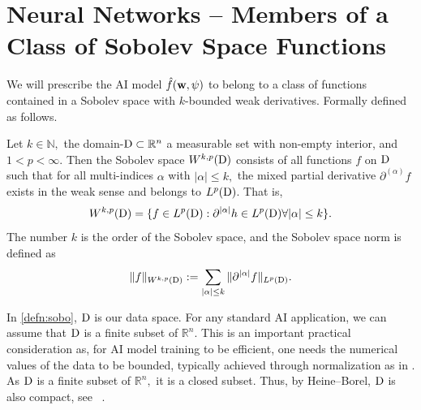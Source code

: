 \section{Neural Networks --  Members of a Class of Sobolev Space Functions}\label{sec:sobolev}
We will prescribe the AI model $\hat{f}(\boldsymbol{\mathrm{w}}, \psi)$ to belong to a class of functions contained in a Sobolev space with $k$-bounded weak derivatives. Formally defined as follows.
\begin{definition}\label{defn:sobo}
    Let $k \in \mathbb{N},$ the domain-$\mathrm{D} \subset \mathbb{R}^n$ a measurable set with non-empty interior, and $1< p < \infty.$ Then the Sobolev space $W^{k,p}(\mathrm{D})$ consists of all functions $f$ on $\mathrm{D}$ such that for all multi-indices $\alpha$ with $|\alpha| \leq k,$ the mixed partial derivative $\partial^{(\alpha)} f$ exists in the weak sense and belongs to $L^p(\mathrm{D})$. That is, 
    \[ W^{k,p}(\mathrm{D})  = \{ f \in L^p(\mathrm{D}) : \partial^{|\alpha|} h \in L^{p}(\mathrm{D}) \forall |\alpha| \leq k \}.\]
    The number $k$ is the order of the Sobolev space, and the Sobolev space norm is defined as 
    \[ \|f\|_{W^{k,p}(\mathrm{D})} := \sum_{ |\alpha| \leq k } \| \partial^{|\alpha|} f \|_{L^{p}(\mathrm{D})}.\]
\end{definition}
In \cref{defn:sobo}, $\mathrm{D}$ is our data space. For any standard AI application, we can assume that $\mathrm{D}$ is a finite subset of $\mathbb{R}^n.$ This is an important practical consideration as, for AI model training to be efficient, one needs the numerical values of the data to be bounded, typically achieved through normalization as in \cite{huang2023normalization}. As $\mathrm{D}$ is a finite subset of $\mathbb{R}^n,$ it is a closed subset. Thus, by Heine--Borel, $\mathrm{D}$ is also compact, see ~\cite{rudin1976principles}.

